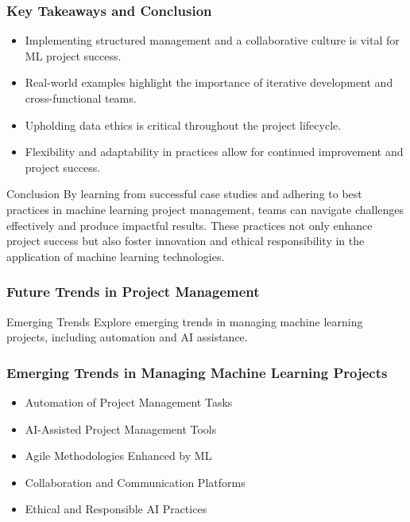 \documentclass[aspectratio=169]{beamer}
\begin{document}
\begin{frame}[fragile]
    \frametitle{Key Takeaways and Conclusion}
    \begin{itemize}
        \item Implementing structured management and a collaborative culture is vital for ML project success.
        \item Real-world examples highlight the importance of iterative development and cross-functional teams.
        \item Upholding data ethics is critical throughout the project lifecycle.
        \item Flexibility and adaptability in practices allow for continued improvement and project success.
    \end{itemize}
    \begin{block}{Conclusion}
        By learning from successful case studies and adhering to best practices in machine learning project management, teams can navigate challenges effectively and produce impactful results. These practices not only enhance project success but also foster innovation and ethical responsibility in the application of machine learning technologies.
    \end{block}
\end{frame}

\begin{frame}[fragile]
    \frametitle{Future Trends in Project Management}
    \begin{block}{Emerging Trends}
        Explore emerging trends in managing machine learning projects, including automation and AI assistance.
    \end{block}
\end{frame}

\begin{frame}[fragile]
    \frametitle{Emerging Trends in Managing Machine Learning Projects}
    \begin{itemize}
        \item Automation of Project Management Tasks
        \item AI-Assisted Project Management Tools
        \item Agile Methodologies Enhanced by ML
        \item Collaboration and Communication Platforms
        \item Ethical and Responsible AI Practices
    \end{itemize}
\end{frame}
\end{document}

